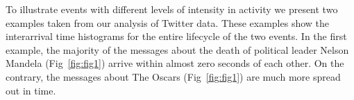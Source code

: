 To illustrate events with different levels of intensity in activity we
present two examples taken from our analysis of Twitter data. These
examples show the interarrival time histograms for the entire lifecycle of
the two events. In
the first example, the majority of the messages about
the death of political leader Nelson Mandela
(Fig~\ref{fig:fig1}) arrive within almost zero seconds of
each other. On the contrary, the messages about The Oscars
(Fig~\ref{fig:fig1}) are much more spread out in time.
%
%
%
